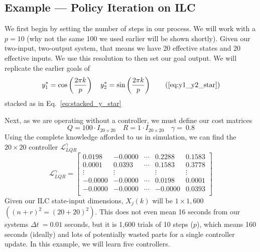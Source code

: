 \FloatBarrier\subsection{Example --- Policy Iteration on ILC}
We first begin by setting the number of steps in our process. We will work with a $p=10$ (why not the same 100 we used earlier will be shown shortly). Given our two-input, two-output system, that means we have 20 effective states and 20 effective inputs. We use this resolution to then set our goal output. We will replicate the earlier goals of
\begin{equation}
    y_1^\ast=\cos\left(\frac{2\pi k}{p}\right)
    \quad
    y_2^\ast=\sin\left(\frac{2\pi k}{p}\right)
    \tag{\ref{eq:y1_y2_star}}
\end{equation}
stacked as in Eq.~\ref{eq:stacked_y_star}

Next, as we are operating without a controller, we must define our cost matrices
\begin{equation}
    Q=100\cdot I_{20\times 20}
    \quad
    R=1\cdot I_{20\times 20}
    \quad
    \gamma=\ 0.8
    \label{eq:rl_ilc_params}
\end{equation}
Using the complete knowledge afforded to us in simulation, we can find the $20 \times20$ controller $\mathcal{L}_{LQR}^\gamma$
\begin{equation}
    \mathcal{L}_{LQR}^\gamma=\left[\begin{matrix}0.0198&-0.0000&\cdots&0.2288&0.1583\\0.0001&0.0393&\cdots&0.1583&0.3778\\\vdots&\vdots&&\vdots&\vdots\\-0.0000&-0.0000&\cdots&0.0198&0.0001\\-0.0000&-0.0000&\cdots&-0.0000&0.0393\\\end{matrix}\right]
    \label{eq:ilc_lqr_controller}
\end{equation}
Given our ILC state-input dimensions, $X_j\left(k\right)$ will be $1 \times1,600$ $({\left(n+r\right)}^2={\left(20+20\right)}^2)$. This does not even mean 16 seconds from our systems $\Delta t\ = 0.01$ seconds, but it is 1,600 trials of 10 steps ($p$), which means 160 seconds (ideally) and lots of potentially wasted parts for a single controller update. In this example, we will learn five controllers.

